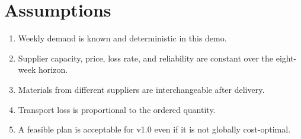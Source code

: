 \section{Assumptions}

\begin{enumerate}
  \item Weekly demand is known and deterministic in this demo.
  \item Supplier capacity, price, loss rate, and reliability are constant over the eight-week horizon.
  \item Materials from different suppliers are interchangeable after delivery.
  \item Transport loss is proportional to the ordered quantity.
  \item A feasible plan is acceptable for v1.0 even if it is not globally cost-optimal.
\end{enumerate}

